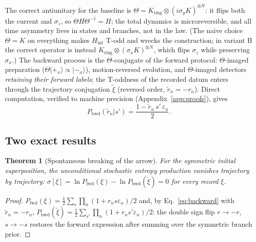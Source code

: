 \documentclass[11pt]{article}
\newtheorem{theorem}{Theorem}
\begin{document}
The correct antiunitary for the baseline is $\Theta = K_{\mathrm{ring}}\otimes(i\sigma_yK)^{\otimes N}$: it flips both the current and $\sigma_z$, so $\Theta H\Theta^{-1}=H$; the total dynamics is microreversible, and all time asymmetry lives in states and branches, not in the law. (The naive choice $\Theta=K$ on everything makes $H_{\mathrm{int}}$ T-odd and wrecks the construction; in variant B the correct operator is instead $K_{\mathrm{ring}}\otimes(\sigma_xK)^{\otimes N}$, which flips $\sigma_z$ while preserving $\sigma_x$.) The backward process is the $\Theta$-conjugate of the forward protocol: $\Theta$-imaged preparation ($\Theta|+_x\rangle\propto|-_x\rangle$), motion-reversed evolution, and $\Theta$-imaged detectors \emph{retaining their forward labels}; the T-oddness of the recorded datum enters through the trajectory conjugation $\tilde\xi$ (reversed order, $\tilde r_n=-r_n$). Direct computation, verified to machine precision (Appendix~\ref{app:proofs}), gives
\begin{equation}
P_{\mathrm{bwd}}(\tilde r_n|s') = \frac{1-\tilde r_n\,s'\,\varepsilon_n}{2}.
\label{eq:backward}
\end{equation}

\subsection{Two exact results}

\begin{theorem}[Spontaneous breaking of the arrow]\label{th:zero}
For the symmetric initial superposition, the unconditional stochastic entropy production vanishes trajectory by trajectory:
$\sigma[\xi]=\ln P_{\mathrm{fwd}}(\xi)-\ln P_{\mathrm{bwd}}(\tilde\xi)=0$ for every record $\xi$.
\end{theorem}

\begin{proof}
$P_{\mathrm{fwd}}(\xi)=\tfrac12\sum_s\prod_n(1+r_ns\varepsilon_n)/2$ and, by Eq.~\eqref{eq:backward} with $\tilde r_n=-r_n$,
$P_{\mathrm{bwd}}(\tilde\xi)=\tfrac12\sum_{s'}\prod_n(1+r_ns'\varepsilon_n)/2$: the double sign flip $r\to-r$, $s\to-s$ restores the forward expression after summing over the symmetric branch prior.
\end{proof}
\end{document}
